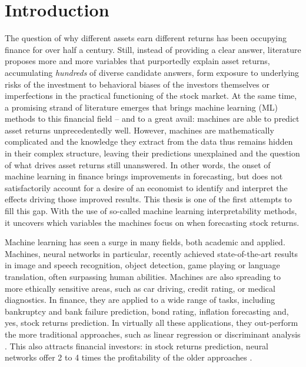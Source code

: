 \chapter{Introduction}
\label{chap:int}

The question of why different assets earn different returns has been occupying finance for over half a century. Still, instead of providing a clear answer, literature proposes more and more variables that purportedly explain asset returns, accumulating \textit{hundreds} of diverse candidate answers, form exposure to underlying risks of the investment to behavioral biases of the investors themselves or imperfections in the practical functioning of the stock market. At the same time, a promising strand of literature emerges that brings machine learning (ML) methods to this financial field -- and to a great avail: machines are able to predict asset returns unprecedentedly well. However, machines are mathematically complicated and the knowledge they extract from the data thus remains hidden in their complex structure, leaving their predictions unexplained and the question of what drives asset returns still unanswered. In other words, the onset of machine learning in finance brings improvements in forecasting, but does not satisfactorily account for a desire of an economist to identify and interpret the effects driving those improved results. This thesis is one of the first attempts to fill this gap. With the use of so-called machine learning interpretability methods, it uncovers which variables the machines focus on when forecasting stock returns. 

Machine learning has seen a surge in many fields, both academic and applied. Machines, neural networks in particular, recently achieved state-of-the-art results in image and speech recognition, object detection, game playing or language translation, often surpassing human abilities. Machines are also spreading to more ethically sensitive areas, such as car driving, credit rating, or medical diagnostics. In finance, they are applied to a wide range of tasks, including bankruptcy and bank failure prediction, bond rating, inflation forecasting and, yes, stock returns prediction. In virtually all these applications, they out-perform the more traditional approaches, such as linear regression or discriminant analysis \citep{fadlalla2001analysis}. This also attracts financial investors: in stock returns prediction, neural networks offer 2 to 4 times the profitability of the older approaches \citep{gu2020empirical, tobek2020does}.  

